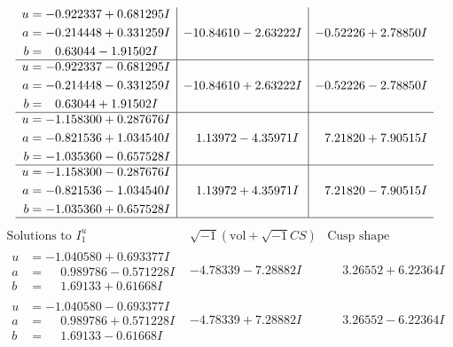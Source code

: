\documentclass[1p]{elsarticle_modified}
\theoremstyle{definition}
\newcommand{\I}{\sqrt{-1}}
\begin{document}
$$\begin{array}{c|c|c}
\begin{aligned}
u &= -0.922337 + 0.681295 I \\
a &= -0.214448 + 0.331259 I \\
b &= \phantom{-}0.63044 - 1.91502 I\end{aligned}
 & -10.84610 - 2.63222 I & -0.52226 + 2.78850 I \\ \hline\begin{aligned}
u &= -0.922337 - 0.681295 I \\
a &= -0.214448 - 0.331259 I \\
b &= \phantom{-}0.63044 + 1.91502 I\end{aligned}
 & -10.84610 + 2.63222 I & -0.52226 - 2.78850 I \\ \hline\begin{aligned}
u &= -1.158300 + 0.287676 I \\
a &= -0.821536 + 1.034540 I \\
b &= -1.035360 - 0.657528 I\end{aligned}
 & \phantom{-}1.13972 - 4.35971 I & \phantom{-}7.21820 + 7.90515 I \\ \hline\begin{aligned}
u &= -1.158300 - 0.287676 I \\
a &= -0.821536 - 1.034540 I \\
b &= -1.035360 + 0.657528 I\end{aligned}
 & \phantom{-}1.13972 + 4.35971 I & \phantom{-}7.21820 - 7.90515 I\\
 \hline 
 \end{array}$$\newpage$$\begin{array}{c|c|c}  
\text{Solutions to }I^u_{1}& \I (\text{vol} + \sqrt{-1}CS) & \text{Cusp shape}\\
 \hline 
\begin{aligned}
u &= -1.040580 + 0.693377 I \\
a &= \phantom{-}0.989786 - 0.571228 I \\
b &= \phantom{-}1.69133 + 0.61668 I\end{aligned}
 & -4.78339 - 7.28882 I & \phantom{-}3.26552 + 6.22364 I \\ \hline\begin{aligned}
u &= -1.040580 - 0.693377 I \\
a &= \phantom{-}0.989786 + 0.571228 I \\
b &= \phantom{-}1.69133 - 0.61668 I\end{aligned}
 & -4.78339 + 7.28882 I & \phantom{-}3.26552 - 6.22364 I \\ \hline\begin{aligned}

\end{aligned}
\end{array}$$
\end{document}
